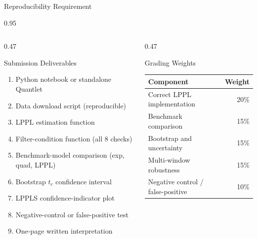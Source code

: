 \documentclass[9pt, aspectratio=169, t]{beamer}
\begin{document}
\begin{frame}{Reproducibility Requirement}
    \begin{cminipage}{0.95\textwidth}
    {\scriptsize
    \begin{columns}[T]
        \begin{column}{0.47\textwidth}
            \begin{block}{Submission Deliverables}
                \begin{enumerate}\setlength{\itemsep}{0pt}
                    \item Python notebook or standalone Quantlet
                    \item Data download script (reproducible)
                    \item LPPL estimation function
                    \item Filter-condition function (all 8 checks)
                    \item Benchmark-model comparison (exp, quad, LPPL)
                    \item Bootstrap $t_c$ confidence interval
                    \item LPPLS confidence-indicator plot
                    \item Negative-control or false-positive test
                    \item One-page written interpretation
                \end{enumerate}
            \end{block}
        \end{column}
        \begin{column}{0.47\textwidth}
            \begin{alertblock}{Grading Weights}
                {\scriptsize
                \begin{center}
                    \begin{tabular}{lr}
                        \toprule
                        \textbf{Component} & \textbf{Weight} \\
                        \midrule
                        Correct LPPL implementation & 20\% \\
                        Benchmark comparison & 15\% \\
                        Bootstrap and uncertainty & 15\% \\
                        Multi-window robustness & 15\% \\
                        Negative control / false-positive & 10\% \\

\end{tabular}
\end{center}}
\end{alertblock}
\end{column}
\end{columns}}
\end{cminipage}
\end{frame}
\end{document}
